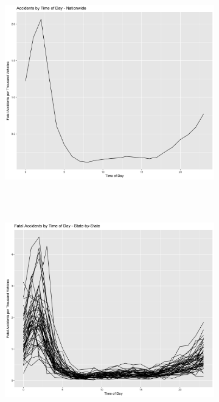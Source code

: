 \documentclass[11pt, oneside,titlepage]{article}   	%
\begin{document}
\begin{figure}[H]
\centering
\begin{subfigure}{.5\textwidth}
	\centering
	\includegraphics[width=.9\textwidth,height=9cm,keepaspectratio]{WeightedNationalDayTrends.png}
	\label{fig:sub1}
\end{subfigure}%
\begin{subfigure}{.5\textwidth}
  \centering
	\includegraphics[width=.9\textwidth, height=9cm,keepaspectratio]{WeightedStatePlot.png}
  \label{fig:sub2}
\end{subfigure}
\label{fig:test}
\end{figure}
\end{document}
